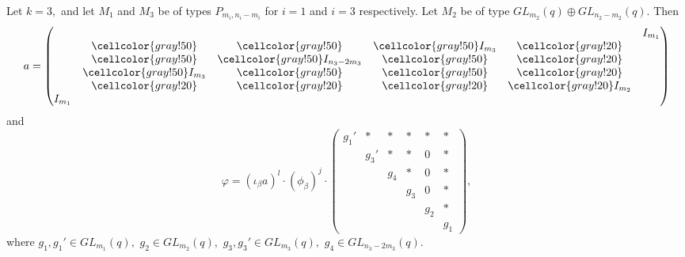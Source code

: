 \begin{example}
Let $k=3,$ and let $M_1$ and $M_3$ be of types $P_{m_i, n_i-m_i}$ for $i=1$ and $i=3$ respectively. Let $M_2$ be of type $GL_{m_2}(q) \oplus GL_{n_2-m_2}(q).$ Then 
$$
a=\begin{pmatrix}
 & & & & &  I_{m_1} \\
 &{\cellcolor{gray!50}} &{\cellcolor{gray!50}} &{\cellcolor{gray!50}} I_{m_3} &{\cellcolor{gray!20}} & \\
 & {\cellcolor{gray!50}} &{\cellcolor{gray!50}} I_{n_3-2m_3} &{\cellcolor{gray!50}} &{\cellcolor{gray!20}} & \\
 &{\cellcolor{gray!50}} I_{m_3} &{\cellcolor{gray!50}} & {\cellcolor{gray!50}} &{\cellcolor{gray!20}} & \\
 & {\cellcolor{gray!20}} & {\cellcolor{gray!20}} &{\cellcolor{gray!20}} &{\cellcolor{gray!20}} I_{m_2} & \\
I_{m_1} & & & & & 
\end{pmatrix}
$$
and $$\varphi = (\iota_{\beta}a)^l \cdot (\phi_{\beta})^j \cdot \begin{pmatrix}
 g_1 '&* &* &* &* &* \\
 & g_3' &* &* &0 &* \\
 & &g_4 &* &0 &* \\
 & & &g_3 &0 &* \\
 & & & & g_2 &* \\
 & & & & & g_1
\end{pmatrix}, $$
where $g_1, g_1' \in GL_{m_1}(q),$ $g_2 \in GL_{m_2}(q),$ $g_3, g_3' \in GL_{m_3}(q),$ $g_4 \in GL_{n_3-2m_3}(q).$
\end{example}

